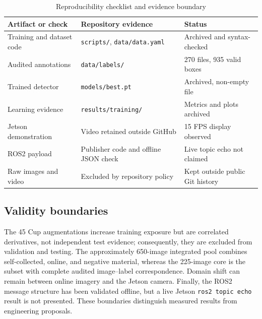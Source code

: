 \documentclass[a4paper,11pt]{article}
\begin{document}
\begin{table}[htbp]\centering\caption{Reproducibility checklist and evidence boundary}\label{tab:repro}
{\renewcommand{\arraystretch}{1.08}\begin{tabular}{p{4.4cm}p{5.1cm}p{4.0cm}}\toprule
\textbf{Artifact or check} & \textbf{Repository evidence} & \textbf{Status}\\\midrule
Training and dataset code & \texttt{scripts/}, \texttt{data/data.yaml} & Archived and syntax-checked\\
Audited annotations & \texttt{data/labels/} & 270 files, 935 valid boxes\\
Trained detector & \texttt{models/best.pt} & Archived, non-empty file\\
Learning evidence & \texttt{results/training/} & Metrics and plots archived\\
Jetson demonstration & Video retained outside GitHub & 15 FPS display observed\\
ROS2 payload & Publisher code and offline JSON check & Live topic echo not claimed\\
Raw images and video & Excluded by repository policy & Kept outside public Git history\\\bottomrule
\end{tabular}}\end{table}

\subsection{Validity boundaries}
The 45 Cup augmentations increase training exposure but are correlated derivatives, not independent test evidence; consequently, they are excluded from validation and testing. The approximately 650-image integrated pool combines self-collected, online, and negative material, whereas the 225-image core is the subset with complete audited image--label correspondence. Domain shift can remain between online imagery and the Jetson camera. Finally, the ROS2 message structure has been validated offline, but a live Jetson \texttt{ros2 topic echo} result is not presented. These boundaries distinguish measured results from engineering proposals.
\end{document}
